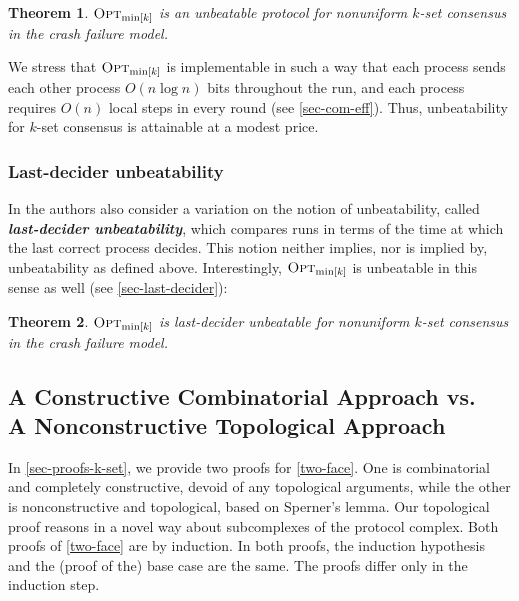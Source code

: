 \documentclass[11pt]{article}
\newtheorem{theorem}{Theorem}
\theoremstyle{definition}
\newcommand{\OptMink}{\mbox{$\mbox{\sc Opt}_{\min[k]}$}}
\newcommand{\defemph}[1]{\textbf{\textit{#1}}}
\begin{document}
\begin{theorem}
\label{thm:OptMink}
$\OptMink$ is an unbeatable protocol for non\-uniform $k$-set consensus in the crash failure model.
\end{theorem}

We stress that $\OptMink$ is implementable in such a way that each process sends
each other process $O(n\log n)$ bits throughout the run, and each process requires $O(n)$ local steps in every round (see \cref{sec-com-eff}).
Thus, unbeatability for $k$-set consensus is attainable at a modest price.

\subsubsection{Last-decider unbeatability}
In \cite{AYY-DISC} the authors also consider  a variation on the notion of unbeatability, called \defemph{last-decider unbeatability}, which compares runs in terms of the time at which the last correct process decides.
This notion neither implies, nor is implied by, unbeatability as defined above.
Interestingly, $\OptMink$ is unbeatable in this sense as well (see \cref{sec-last-decider}):

\begin{theorem}
\label{thm:last-decider}
$\OptMink$ is last-decider unbeatable for non\-uniform $k$-set consensus in the crash failure model.
\end{theorem}

\subsection{A Constructive Combinatorial Approach vs.\texorpdfstring{\\}{ }A Nonconstructive Topological Approach}
\label{two-approaches}

In \cref{sec-proofs-k-set}, we provide
two proofs for \cref{two-face}. One is combinatorial and completely constructive,
devoid of any topological arguments, while the other
 is nonconstructive and topological, based on Sperner's lemma.
Our topological proof  reasons in a novel way about subcomplexes of the protocol complex.
Both proofs of
\cref{two-face} are by induction.
In both proofs, the induction hypothesis and the (proof of the) base case are the same.
The proofs differ only in
the induction step.
\end{document}
